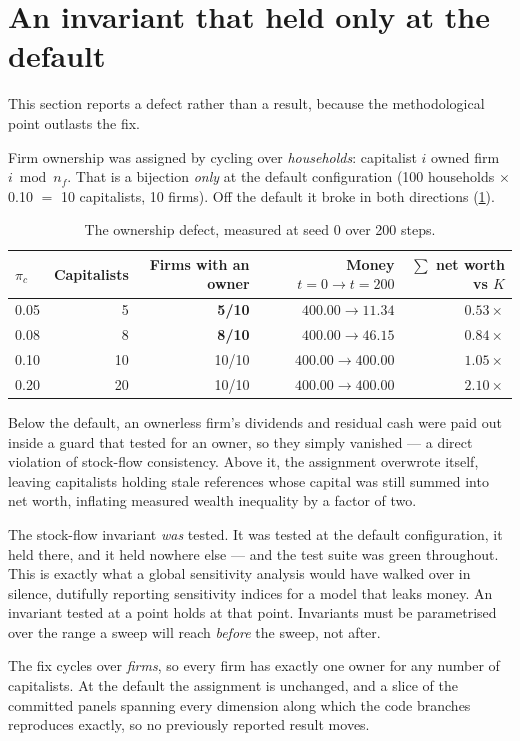 
\section{An invariant that held only at the default}
\label{sec:ownership}

This section reports a defect rather than a result, because the methodological
point outlasts the fix.

Firm ownership was assigned by cycling over \emph{households}: capitalist $i$
owned firm $i \bmod n_f$. That is a bijection \emph{only} at the default
configuration (100 households $\times$ 0.10 $=$ 10 capitalists, 10 firms). Off
the default it broke in both directions (\cref{tab:ownership}).

\begin{table}[htbp]
\centering
\small
\caption{The ownership defect, measured at seed 0 over 200 steps.}
\label{tab:ownership}
\begin{tabular}{lrrrr}
\toprule
$\pi_c$ & Capitalists & Firms with an owner & Money $t{=}0 \to t{=}200$
& $\sum$ net worth vs $K$\\
\midrule
0.05 & 5  & \textbf{5/10}  & $400.00 \to \mathbf{11.34}$ & $0.53\times$\\
0.08 & 8  & \textbf{8/10}  & $400.00 \to \mathbf{46.15}$ & $0.84\times$\\
0.10 & 10 & 10/10 & $400.00 \to 400.00$ & $1.05\times$\\
0.20 & 20 & 10/10 & $400.00 \to 400.00$ & $\mathbf{2.10\times}$\\
\bottomrule
\end{tabular}
\end{table}

Below the default, an ownerless firm's dividends and residual cash were paid
out inside a guard that tested for an owner, so they simply vanished --- a
direct violation of stock-flow consistency. Above it, the assignment
overwrote itself, leaving capitalists holding stale references whose capital
was still summed into net worth, inflating measured wealth inequality by a
factor of two.

\begin{declbox}[frametitle={The point worth keeping}]
The stock-flow invariant \emph{was} tested. It was tested at the default
configuration, it held there, and it held nowhere else --- and the test suite
was green throughout. This is exactly what a global sensitivity analysis
would have walked over in silence, dutifully reporting sensitivity indices for
a model that leaks money. An invariant tested at a point holds at that point.
Invariants must be parametrised over the range a sweep will reach
\emph{before} the sweep, not after.
\end{declbox}

The fix cycles over \emph{firms}, so every firm has exactly one owner for any
number of capitalists. At the default the assignment is unchanged, and a slice
of the committed panels spanning every dimension along which the code branches
reproduces exactly, so no previously reported result moves.
